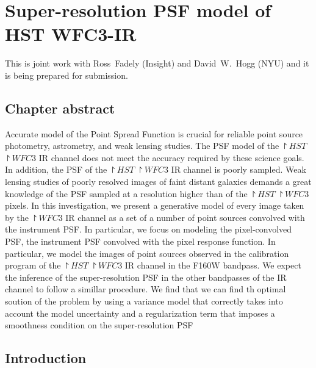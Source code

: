 \newcommand{\todo}[1]{{\em \textcolor{red}{ #1}}}
\newcommand{\beq}{\begin{equation}}
\newcommand{\eeq}{\end{equation}}
\newcommand{\lang}{\langle}
\newcommand{\ra}{\rangle}
\newcommand{\vep}{\bm{\epsilon}}
\newcommand{\ep}{\epsilon}
\newcommand{\pars}{\vec{\theta}}
\newcommand{\dev}{\mathrm{d}}
\newcommand{\mstar}{h^{-1}M_\odot}
\newcommand{\hst}{\project{HST}}
\newcommand{\wfc}{\project{WFC3}}

\chapter{Super-resolution PSF model of HST WFC3-IR}

This \paper is joint work with Ross~Fadely (Insight) and David~W.~Hogg (NYU) and it is being prepared for submission. 

\section{Chapter abstract}

Accurate model of the Point Spread Function is crucial for reliable point source photometry, astrometry, and weak lensing studies.
The PSF model of the $\hst$ $\wfc$ IR channel does not meet the accuracy required by these science goals. In addition, the PSF of the $\hst$ $\wfc$ IR 
channel is poorly sampled. Weak lensing studies of poorly resolved images of faint distant galaxies demands 
a great knowledge of the PSF sampled at a resolution higher than of the $\hst$ $\wfc$ pixels.
In this investigation, we present a generative model of every image taken by the $\wfc$ IR channel as a set of a number of point sources convolved
with the instrument PSF. In particular, we focus on modeling the pixel-convolved PSF, the instrument PSF convolved with the pixel response function. 
In particular, we model the images of point sources observed in the calibration program of the $\hst$ $\wfc$ IR channel in the F160W bandpass. We 
expect the inference of the super-resolution PSF in the other bandpasses of the IR channel to follow a simillar procedure. 
We find that we can find th optimal soution of the problem by using a variance model that correctly takes into account the model 
uncertainty and a regularization term that imposes a smoothness condition on the super-resolution PSF 

\section{Introduction}

